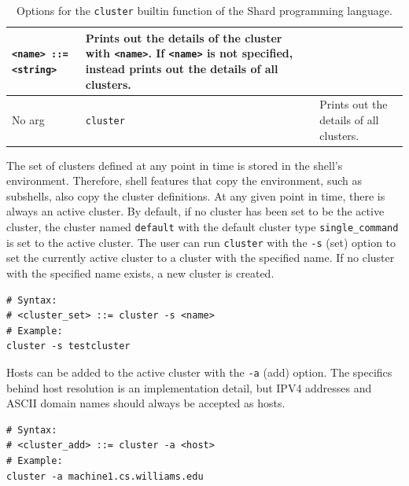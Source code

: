 \documentclass[oneside]{report}
\begin{document}
\begin{table}[h]
\begin{center}
\begin{tabularx}{\textwidth}{|l|X|X|}
      \texttt{<name> ::= <string>}  & Prints out the details of the cluster with \texttt{<name>}. If \texttt{<name>} is not specified, instead prints out the details of all clusters.
      \\ \hline
      No arg                        & \texttt{cluster}                                                                                                                                                                             & Prints out the details of all clusters.
      \\ \hline
    \end{tabularx}
    \caption{Options for the \texttt{cluster} builtin function of the Shard programming language.}
    \label{fig:pl_cluster_options}
  \end{center}
\end{table}

The set of clusters defined at any point in time is stored in the shell's environment.
Therefore, shell features that copy the environment, such as subshells, also copy the cluster definitions.
At any given point in time, there is always an active cluster.
By default, if no cluster has been set to be the active cluster, the cluster named \texttt{default} with the default cluster type \texttt{single\_command} is set to the active cluster.
The user can run \texttt{cluster} with the \texttt{-s} (set) option to set the currently active cluster to a cluster with the specified name.
If no cluster with the specified name exists, a new cluster is created.

\begin{minipage}[c]{\textwidth-15pt}
  \begin{lstlisting}[language=Shard]
# Syntax:
# <cluster_set> ::= cluster -s <name>
# Example:
cluster -s testcluster
\end{lstlisting}
  \smallskip
\end{minipage}

Hosts can be added to the active cluster with the \texttt{-a} (add) option.
The specifics behind host resolution is an implementation detail, but IPV4 addresses and ASCII domain names should always be accepted as hosts.

\begin{minipage}[c]{\textwidth-15pt}
  \begin{lstlisting}[language=Shard]
# Syntax:
# <cluster_add> ::= cluster -a <host>
# Example:
cluster -a machine1.cs.williams.edu
\end{lstlisting}
  \smallskip
\end{minipage}
\end{document}

